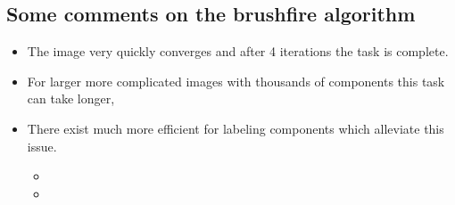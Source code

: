 \documentclass[letterpaper,10pt,english]{sphinxmanual}
\begin{document}
\noindent{}


\subsection{Some comments on the brushfire algorithm}
\label{\detokenize{06-ShapeAnalysis:some-comments-on-the-brushfire-algorithm}}\begin{itemize}
\item {} 
\sphinxAtStartPar
The image very quickly converges and after 4 iterations the task is complete.

\item {} 
\sphinxAtStartPar
For larger more complicated images with thousands of components this task can take longer,

\item {} 
\sphinxAtStartPar
There exist much more efficient  for labeling components which alleviate this issue.
\begin{itemize}
\item {} 
\sphinxAtStartPar
{}

\item {} 
\sphinxAtStartPar
{}

\end{itemize}

\end{itemize}
\end{document}
